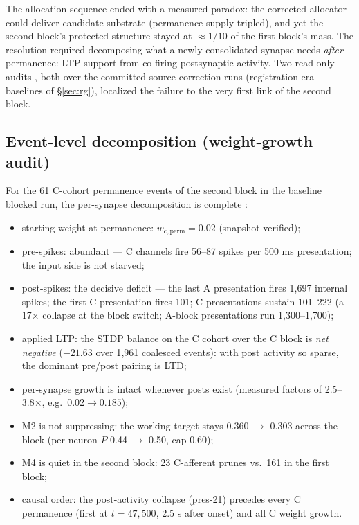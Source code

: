 The allocation sequence ended with a measured paradox: the corrected
allocator could deliver candidate substrate (permanence supply tripled),
and yet the second block's protected structure stayed at \(\approx
1/10\) of the first block's mass. The resolution required decomposing
what a newly consolidated synapse needs \emph{after} permanence: LTP
support from co-firing postsynaptic activity. Two read-only audits
\cite{wgrowth,drive}, both over the committed source-correction runs
(registration-era baselines of \S\ref{sec:rg}), localized the failure
to the very first link of the second block.

\subsection{Event-level decomposition (weight-growth audit)}

For the 61 C-cohort permanence events of the second block in the
baseline blocked run, the per-synapse decomposition is complete
\cite{wgrowth}:

\begin{itemize}
\item starting weight at permanence: \(w_{\mathrm{c,perm}}=0.02\)
(snapshot-verified);
\item pre-spikes: abundant --- C channels fire 56--87 spikes per
500 ms presentation; the input side is not starved;
\item post-spikes: the decisive deficit --- the last A presentation
fires 1{,}697 internal spikes; the first C presentation fires 101;
C presentations sustain 101--222 (a 17\(\times\) collapse at the
block switch; A-block presentations run 1{,}300--1{,}700);
\item applied LTP: the STDP balance on the C cohort over the C block is
\emph{net negative} (\(-21.63\) over 1{,}961 coalesced events): with
post activity so sparse, the dominant pre/post pairing is LTD;
\item per-synapse growth is intact whenever posts exist (measured
factors of 2.5--3.8\(\times\), e.g.\ \(0.02 \to 0.185\));
\item M2 is not suppressing: the working target stays
0.360 \(\to\) 0.303 across the block (per-neuron \(P\)
0.44 \(\to\) 0.50, cap 0.60);
\item M4 is quiet in the second block: 23 C-afferent prunes vs.\ 161 in
the first block;
\item causal order: the post-activity collapse (pres-21) precedes every
C permanence (first at \(t=47{,}500\), 2.5 s after onset) and all C
weight growth.
\end{itemize}

